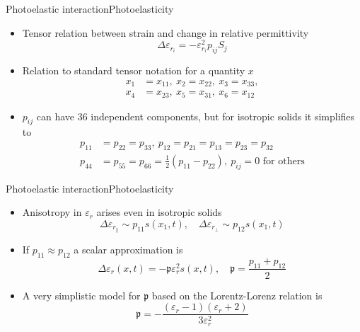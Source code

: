 \documentclass[11pt]{beamer}
\begin{document}
	\begin{frame}{Photoelastic interaction}{Photoelasticity}
		\pause
		\begin{itemize}
			\item Tensor relation between strain and change in relative permittivity
			\begin{equation*}
				\Delta \varepsilon_{r_i} = -\varepsilon_{r_i}^2 p_{ij} S_j
			\end{equation*}
			\pause
			\item Relation to standard tensor notation for a quantity $x$
			\begin{align*}
				x_1 &= x_{11},\ x_2 = x_{22},\ x_3 = x_{33}, \\
				x_4 &= x_{23},\ x_5 = x_{31},\ x_6 = x_{12}
			\end{align*}
			\pause
			\item $p_{ij}$ can have 36 independent components, but for isotropic solids it simplifies to
			\begin{align*}
				p_{11} &= p_{22} = p_{33}, \ p_{12} = p_{21} = p_{13} = p_{23} = p_{32}\\
				p_{44} &= p_{55} = p_{66} = \frac{1}{2} (p_{11} - p_{22}), \ p_{ij} = 0 \text{ for others}
			\end{align*}
		\end{itemize}
	\end{frame}
	
	\begin{frame}{Photoelastic interaction}{Photoelasticity}
		\begin{itemize}
			\item Anisotropy in $\varepsilon_r$ arises even in isotropic solids
			\begin{equation*}
				\Delta \varepsilon_{r_\parallel} \sim p_{11} s(x_1,t), \quad \Delta \varepsilon_{r_\perp} \sim p_{12} s(x_1,t)
			\end{equation*}
			\pause
			\item If  $p_{11} \approx p_{12}$ a scalar approximation is
			\begin{equation*}
				\Delta \varepsilon_r(x,t) = -\mathfrak{p} \varepsilon_r^2 s(x,t), \quad \mathfrak{p} = \frac{p_{11} + p_{12}}{2}
			\end{equation*}
			\pause
			\item A very simplistic model for $\mathfrak{p}$ based on the Lorentz-Lorenz relation is
			\begin{equation*}
				\mathfrak{p} = -\frac{(\varepsilon_r - 1)(\varepsilon_r + 2)}{3\varepsilon_r^2}
			\end{equation*}
		\end{itemize}
	\end{frame}
		
\end{document}
